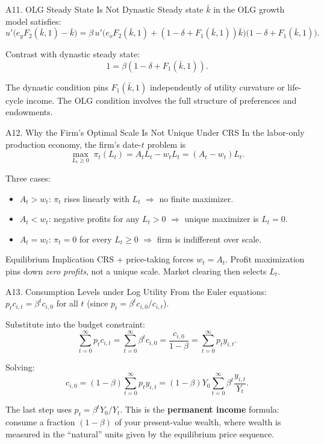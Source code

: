 \documentclass[aspectratio=169,10pt]{beamer}
\newcommand{\backbutton}[1]{\hfill\hyperlink{#1}{\beamerbutton{Back}}}
\begin{document}
\begin{frame}{A11. OLG Steady State Is Not Dynastic}
\hypertarget{a11}{}
Steady state $\bar{k}$ in the OLG growth model satisfies:
\[
u'\big(e_yF_2(\bar{k},1)-\bar{k}\big)
=
\beta\,u'\big(e_oF_2(\bar{k},1)+(1-\delta+F_1(\bar{k},1))\bar{k}\big)
\big(1-\delta+F_1(\bar{k},1)\big).
\]

\medskip
Contrast with dynastic steady state:
\[
1=\beta(1-\delta+F_1(\bar{k},1)).
\]

\medskip
The dynastic condition pins $F_1(\bar{k},1)$ independently of utility curvature or life-cycle income. The OLG condition involves the full structure of preferences and endowments.
\backbutton{m-a11}
\end{frame}

\begin{frame}{A12. Why the Firm's Optimal Scale Is Not Unique Under CRS}
\hypertarget{a12}{}
In the labor-only production economy, the firm's date-$t$ problem is
\[
\max_{L_t\ge 0}\; \pi_t(L_t)=A_tL_t-w_tL_t=(A_t-w_t)L_t.
\]

Three cases:
\begin{itemize}
  \item $A_t>w_t$: $\pi_t$ rises linearly with $L_t$ $\Rightarrow$ no finite maximizer.
  \item $A_t<w_t$: negative profits for any $L_t>0$ $\Rightarrow$ unique maximizer is $L_t=0$.
  \item $A_t=w_t$: $\pi_t=0$ for every $L_t\ge 0$ $\Rightarrow$ firm is indifferent over scale.
\end{itemize}

\begin{block}{Equilibrium Implication}
CRS + price-taking forces $w_t=A_t$. Profit maximization pins down \emph{zero profits}, not a unique scale. Market clearing then selects $L_t$.
\end{block}
\backbutton{m-a12}
\end{frame}

\begin{frame}{A13. Consumption Levels under Log Utility}
\hypertarget{a13}{}
From the Euler equations: $p_t c_{i,t}=\beta^t c_{i,0}$ for all $t$ (since $p_t=\beta^t c_{i,0}/c_{i,t}$).

\medskip
Substitute into the budget constraint:
\[
\sum_{t=0}^{\infty} p_t c_{i,t} = \sum_{t=0}^{\infty} \beta^t c_{i,0} = \frac{c_{i,0}}{1-\beta} = \sum_{t=0}^{\infty}p_t y_{i,t}.
\]

Solving:
\[
c_{i,0}=(1-\beta)\sum_{t=0}^{\infty}p_t y_{i,t} = (1-\beta)Y_0\sum_{t=0}^{\infty}\beta^t \frac{y_{i,t}}{Y_t}.
\]

The last step uses $p_t = \beta^t Y_0/Y_t$. This is the \textbf{permanent income} formula: consume a fraction $(1-\beta)$ of your present-value wealth, where wealth is measured in the ``natural'' units given by the equilibrium price sequence.
\backbutton{m-a13}
\end{frame}
\end{document}
